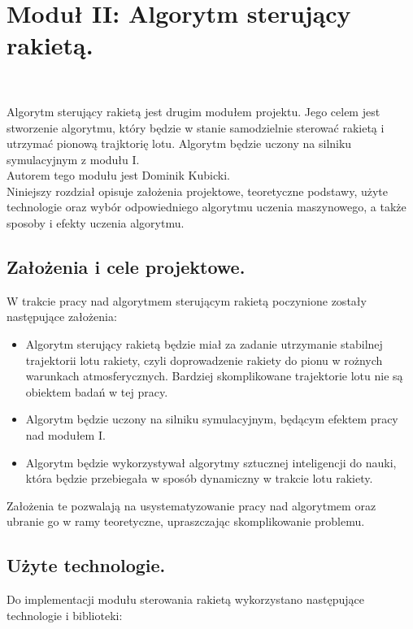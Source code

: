 \chapter{Moduł II: Algorytm sterujący rakietą.}\

Algorytm sterujący rakietą jest drugim modułem projektu.
Jego celem jest stworzenie algorytmu, który będzie w stanie samodzielnie sterować rakietą i utrzymać pionową trajktorię lotu.
Algorytm będzie uczony na silniku symulacyjnym z modułu I.\\
Autorem tego modułu jest Dominik Kubicki.\\
Niniejszy rozdział opisuje założenia projektowe, teoretyczne podstawy, użyte
technologie oraz wybór odpowiedniego algorytmu uczenia maszynowego, a także
sposoby i efekty uczenia algorytmu.\\


\section{Założenia i cele projektowe.}\label{sec:założenia-projektowe-2.}

W trakcie pracy nad algorytmem sterującym rakietą poczynione zostały następujące założenia:

\begin{itemize}
    \item Algorytm sterujący rakietą będzie miał za zadanie utrzymanie stabilnej
    trajektorii lotu rakiety, czyli doprowadzenie rakiety do pionu w rożnych
    warunkach atmosferycznych. Bardziej skomplikowane trajektorie lotu nie
    są obiektem badań w tej pracy.
    \item Algorytm będzie uczony na silniku symulacyjnym, będącym efektem pracy nad modułem I.
    \item Algorytm będzie wykorzystywał algorytmy sztucznej inteligencji do
    nauki, która będzie przebiegała w sposób dynamiczny w trakcie lotu rakiety.
\end{itemize}

Założenia te pozwalają na usystematyzowanie pracy nad algorytmem oraz
ubranie go w ramy teoretyczne, upraszczając skomplikowanie problemu.\\

\section{Użyte technologie.}\label{sec:użyte-technologie-2.}
Do implementacji modułu sterowania rakietą wykorzystano następujące technologie i biblioteki:

